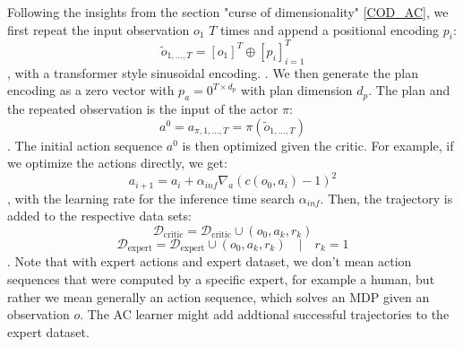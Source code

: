 Following the insights from the section "curse of dimensionality" \ref{COD_AC}, we first repeat the input observation $o_1$ $T$ times and append a positional encoding $p_i$:
\begin{equation}
    \label{eq:seq_emb}
    \tilde{o}_{1, ..., T} = [o_1]^T \oplus [p_i]_{i=1}^T
\end{equation}
, with a transformer style sinusoidal encoding.
. We then generate the plan encoding as a zero vector with $p_a = 0^{T \times d_p}$ with plan dimension $d_p$. The plan and the repeated observation is the input 
of the actor $\pi$:
\begin{equation}
    a^0 = a_{\pi, 1,...,T} = \pi(\tilde{o}_{1, ..., T})
\end{equation}
. The initial action sequence $a^0$ is then optimized given the critic. For example, if we optimize the actions directly, we get:
\begin{equation*}
    a_{i+1} = a_i + \alpha_{inf}\nabla_{a} (c(o_0, a_i) - 1)^2
\end{equation*}
, with the learning rate for the inference time search $\alpha_{inf}$. Then, the trajectory is added to the respective data sets:
\begin{equation}
    \mathcal{D}_{\text{critic}} = \mathcal{D}_{\text{critic}} \cup (o_0, a_k, r_k)
\end{equation}
\begin{equation*}
    \mathcal{D}_{\text{expert}} = \mathcal{D}_{\text{expert}} \cup (o_0, a_k, r_k)\quad |\quad r_k = 1
\end{equation*}
. Note that with expert actions and expert dataset, we don't mean action sequences that were computed by 
a specific expert, for example a human, but rather we mean generally an action sequence, which solves an MDP given an observation $o$. The AC learner might add 
addtional successful trajectories to the expert dataset. \\


